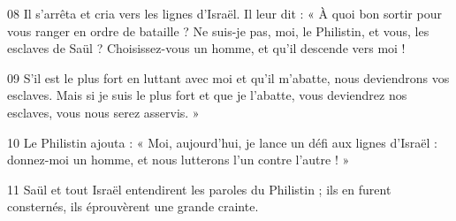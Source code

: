 
08 Il s’arrêta et cria vers les lignes d’Israël. Il leur dit : « À quoi bon sortir pour vous ranger en ordre de bataille ? Ne suis-je pas, moi, le Philistin, et vous, les esclaves de Saül ? Choisissez-vous un homme, et qu’il descende vers moi !

09 S’il est le plus fort en luttant avec moi et qu’il m’abatte, nous deviendrons vos esclaves. Mais si je suis le plus fort et que je l’abatte, vous deviendrez nos esclaves, vous nous serez asservis. »

10 Le Philistin ajouta : « Moi, aujourd’hui, je lance un défi aux lignes d’Israël : donnez-moi un homme, et nous lutterons l’un contre l’autre ! »

11 Saül et tout Israël entendirent les paroles du Philistin ; ils en furent consternés, ils éprouvèrent une grande crainte.
